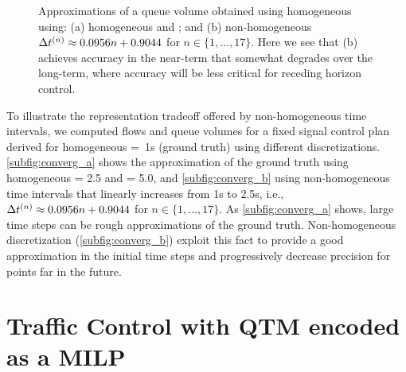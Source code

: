 \begin{figure*}[t!]
\centering
{}
\label{fig:conv}
%
\caption{Approximations of a queue volume obtained using homogeneous
 using: (a) homogeneous  and ; and (b) non-homogeneous
$\DT[n] \approx 0.0956n + 0.9044$ for $n \in \{1,\dots,17\}$.  Here we see
that (b) achieves accuracy in the near-term that somewhat degrades over
the long-term, where accuracy will be less critical for receding horizon control.}
%
\end{figure*}


To illustrate the representation tradeoff offered by non-homogeneous time
intervals, we computed flows and queue volumes for a fixed signal control plan
derived for homogeneous \mbox{\DT[n] = 1s} (ground truth) using different
discretizations.
%
\cref{subfig:converg_a} shows the approximation of the ground truth using
homogeneous \DT[] = 2.5 and \DT[] = 5.0, and \cref{subfig:converg_b} using
non-homogeneous time intervals that linearly increases from 1s to 2.5s, i.e.,
$\DT[n] \approx 0.0956n + 0.9044$ for $n \in \{1,\dots,17\}$.
%
As \cref{subfig:converg_a} shows, large time steps can be rough approximations
of the ground truth.
%
Non-homogeneous discretization (\cref{subfig:converg_b}) exploit this fact to
provide a good approximation in the initial time steps and progressively
decrease precision for points far in the future.






\section{Traffic Control with QTM encoded as a MILP}

